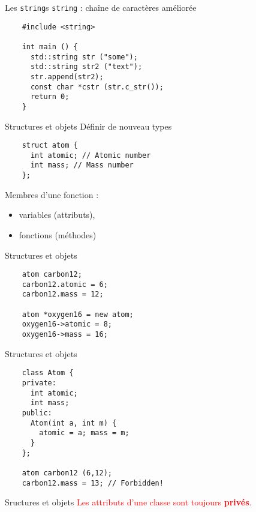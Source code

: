 
\begin{frame}[fragile]{Les \texttt{string}s}
  \texttt{string} : chaîne de caractères améliorée
  \begin{lstlisting}
    #include <string>

    int main () {
      std::string str ("some");
      std::string str2 ("text");
      str.append(str2);
      const char *cstr (str.c_str());
      return 0;
    }
    \end{lstlisting}
\end{frame}

\begin{frame}[fragile]{Structures et objets}
  Définir de nouveau types
  \begin{lstlisting}
    struct atom {
      int atomic; // Atomic number
      int mass; // Mass number
    };
  \end{lstlisting}

  Membres d'une fonction :
  \begin{itemize}
  \item variables (attributs),
  \item fonctions (méthodes)
  \end{itemize}
\end{frame}

\begin{frame}[fragile]{Structures et objets}
  \begin{lstlisting}
    atom carbon12;
    carbon12.atomic = 6;
    carbon12.mass = 12;

    atom *oxygen16 = new atom;
    oxygen16->atomic = 8;
    oxygen16->mass = 16;
  \end{lstlisting}
\end{frame}

\begin{frame}[fragile]{Structures et objets}
  \begin{lstlisting}
    class Atom {
    private:
      int atomic;
      int mass;
    public:
      Atom(int a, int m) {
        atomic = a; mass = m;
      }
    };

    atom carbon12 (6,12);
    carbon12.mass = 13; // Forbidden!
  \end{lstlisting}
\end{frame}

\begin{frame}{Sructures et objets}
  \textcolor{red}{Les attributs d'une classe sont toujours \textbf{privés}.}
\end{frame}

